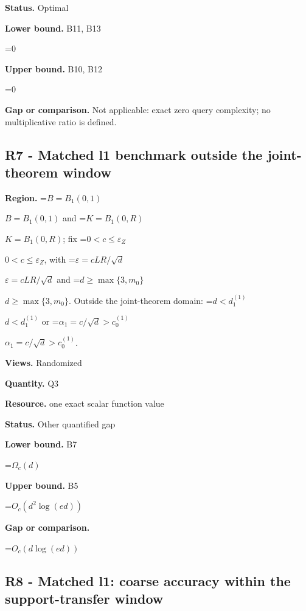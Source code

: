 \documentclass[10pt,a4paper]{article}
\newcommand{\AtlasMath}[1]{\par\begingroup\centering\setbox0=\hbox{$\displaystyle #1$}\ifdim\wd0>1.4\linewidth\typeout{ATLAS WIDE FORMULA: \the\wd0}\fi\ifdim\wd0>\linewidth\resizebox{\linewidth}{!}{\box0}\else\box0\fi\par\endgroup}
\newcommand{\AtlasInlineMath}[1]{\begingroup\setbox0=\hbox{$#1$}\ifdim\wd0>.4\linewidth\endgroup\AtlasMath{#1}\else\endgroup$#1$\fi}
\begin{document}
\textbf{Status.} Optimal



\textbf{Lower bound.} B11, B13



\AtlasMath{0}


\textbf{Upper bound.} B10, B12



\AtlasMath{0}


\textbf{Gap or comparison.} Not applicable: exact zero query complexity; no multiplicative ratio is defined.



\subsection{R7 - Matched l1 benchmark outside the joint-theorem window}


\textbf{Region.} \AtlasInlineMath{B=B_1(0,1)} and \AtlasInlineMath{K=B_1(0,R)}; fix \AtlasInlineMath{0<c\le\varepsilon_Z}, with \AtlasInlineMath{\varepsilon=cLR/\sqrt d} and \AtlasInlineMath{d\ge\max\{3,m_0\}}. Outside the joint-theorem domain: \AtlasInlineMath{d<d_1^{(1)}} or \AtlasInlineMath{\alpha_1=c/\sqrt d>c_0^{(1)}}.



\textbf{Views.} Randomized



\textbf{Quantity.} Q3



\textbf{Resource.} one exact scalar function value



\textbf{Status.} Other quantified gap



\textbf{Lower bound.} B7



\AtlasMath{\Omega_c(d)}


\textbf{Upper bound.} B5



\AtlasMath{O_c(d^2\log(ed))}


\textbf{Gap or comparison.}



\AtlasMath{O_c(d\log(ed))}


\subsection{R8 - Matched l1: coarse accuracy within the support-transfer window}
\end{document}
